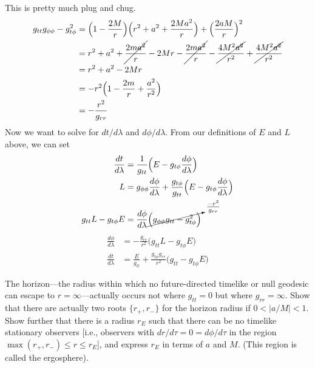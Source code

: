 \documentclass[11pt,largemargins]{homework}
\begin{document}
\begin{alphaparts}
This is pretty much plug and chug.
\begin{subequations}
\begin{align*}
g_{tt}g_{\phi \phi} - g_{t \phi}^2 &= \Big(1 - \frac{2M}{r} \Big) \Big(r^2 + a^2 + \frac{2Ma^2}{r} \Big) + \Big(\frac{2aM}{r}\Big)^2 \\
&= r^2 + a^2 + \cancel{\frac{2ma^2}{r}} - 2Mr - \cancel{\frac{2ma^2}{r}} - \cancel{\frac{4M^2a^2}{r^2}} + \cancel{\frac{4M^2a^2}{r^2}} \\
&= r^2 + a^2 - 2Mr \\
&= -r^2 \Big(1 - \frac{2m}{r} + \frac{a^2}{r^2} \Big) \\
&= -\frac{r^2}{g_{rr}}
\end{align*}
\end{subequations}
Now we want to solve for $dt/d\lambda$ and $d\phi / d\lambda$.  From our definitions of $E$ and $L$ above, we can set
\begin{subequations}
\begin{align*}
\frac{dt}{d\lambda} &= \frac{1}{g_{tt}} \Big(E - g_{t\phi} \frac{d\phi}{d\lambda} \Big) \\
L &= g_{\phi \phi} \frac{d\phi}{d\lambda} + \frac{g_{t\phi}}{g_{tt}} \Big(E - g_{t \phi} \frac{d \phi}{d \lambda} \Big) \\
g_{tt} L - g_{t \phi} E &= \frac{d\phi}{d\lambda} \cancelto{\frac{-r^2}{g_{rr}}}{\Big(g_{\phi \phi}g_{tt} - g_{t \phi}^{2}\Big)}
\end{align*}
\end{subequations}
\begin{subequations}
\begin{align*}
\frac{d\phi}{d\lambda} &= - \frac{g_{rr}}{r^2} \Big(g_{tt}L - g_{t \phi} E\Big) \\
\frac{dt}{d\lambda} &= \frac{E}{g_{tt}} + \frac{g_{t \phi} g_{rr}}{r^2} \Big(g_{tt} - g_{t \phi}E \Big) 
\end{align*}
\end{subequations}

\questionpart
The horizon---the radius within which no future-directed timelike or null geodesic can escape to $r = \infty$---actually occurs not where $g_{tt} = 0$ but where $g_{rr} = \infty$.  Show that there are actually two roots $\{r_+, r_-\}$ for the horizon radius if $0 < \lvert a/M \rvert < 1$.  Show further that there is a radius $r_E$ such that there can be no timelike stationary observers [i.e., observers with $dr/d\tau = 0 = d\phi / d\tau$ in the region $\max(r_+, r_-) \leq r \leq r_E$], and express $r_E$ in terms of $a$ and $M$.  (This region is called the ergosphere).


\end{alphaparts}
\end{document}
